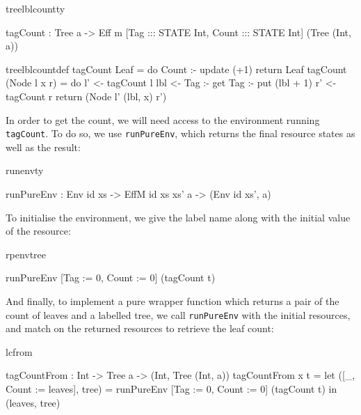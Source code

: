 \begin{SaveVerbatim}{treelblcountty}

tagCount : Tree a -> Eff m [Tag   ::: STATE Int, 
                            Count ::: STATE Int] 
                              (Tree (Int, a))
\end{SaveVerbatim}
\begin{SaveVerbatim}{treelblcountdef}
tagCount Leaf
     = do Count :- update (+1)
          return Leaf
tagCount (Node l x r) 
     = do l' <- tagCount l
          lbl <- Tag :- get
          Tag :- put (lbl + 1)
          r' <- tagCount r
          return (Node l' (lbl, x) r')

\end{SaveVerbatim}



\noindent
In order to get the count, we will need access to the environment 
running \texttt{tagCount}. To do so, we use \texttt{runPureEnv}, which returns
the final resource states as well as the result:

\begin{SaveVerbatim}{runenvty}

runPureEnv : Env id xs -> 
             EffM id xs xs' a -> (Env id xs', a)

\end{SaveVerbatim}

\noindent
To initialise the environment, we give the label name along with the initial
value of the resource:

\begin{SaveVerbatim}{rpenvtree}

runPureEnv [Tag := 0, Count := 0] (tagCount t) 

\end{SaveVerbatim}

\noindent
And finally, to implement a pure wrapper function which returns a pair of the
count of leaves and a labelled tree, we call \texttt{runPureEnv} with the
initial resources, and match on the returned resources to retrieve the leaf
count:

\begin{SaveVerbatim}{lcfrom}

tagCountFrom : Int -> Tree a -> (Int, Tree (Int, a))
tagCountFrom x t 
    = let ([_, Count := leaves], tree) =
       runPureEnv [Tag := 0, Count := 0] (tagCount t)
          in (leaves, tree)

\end{SaveVerbatim}

